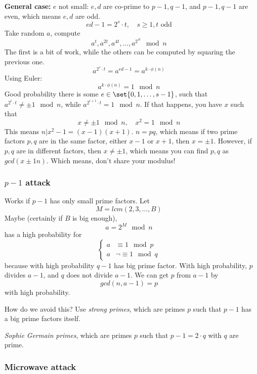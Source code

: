 \documentclass[language=english,number=]{homework}
\begin{document}
    \textbf{General case:} $e$ not small:
    $e,d$ are co-prime to $p-1,q-1$, and $p-1,q-1$ are even, which means $e,d$ are odd.
    \[
        ed-1 = 2^s \cdot t, \quad s \ge 1, t \text{ odd}
    \]
    Take random $a$, compute
    \[
        a^t, a^{2t}, a^{4t}, \dots, a^{2^{st}} \mod n
    \]
    The first is a bit of work, while the others can be computed by squaring the previous one.
    \[
        a^{2^s \cdot t} = a^{ed-1}= a^{k \cdot \phi(n)}
    \]
    Using Euler:
    \[
        a^{k \cdot \phi(n)} = 1 \mod n
    \]
    Good probability there is some $e \in \set{0,1, \dots, s-1}$, such that $a^{2^i \cdot t} \ne \pm 1 \mod n$, while $a^{2^{i+1} \cdot t} = 1 \mod n$.
    If that happens, you have $x$ such that
    \[
        x \ne \pm 1 \mod n, \quad x^2  = 1 \mod n
    \]
    This means $n| x^2 - 1 = (x-1)(x+1)$.
    $n = pq$, which means if two prime factors $p,q$ are in the same factor, either $x-1$ or $x+1$, then $x = \pm 1$.
    However, if $p,q$ are in different factors, then $x \ne \pm 1$, which means you can find $p,q$ as $gcd(x \pm 1 n)$.
    Which means, don't share your modulus!

    \subsubsection{$p-1$ attack}

    Works if $p-1$ has only small prime factors.
    Let
    \[
        M = lcm(2,3,\dots,B)
    \]
    Maybe (certainly if $B$ is big enough),
    \[
        a = 2^M \mod n
    \]
    has a high probability for
    \[
        \begin{cases}
            a &\equiv 1 \mod p \\
            a &\neg \equiv 1 \mod q
        \end{cases}
    \]
    because with high probability $q-1$ has big prime factor.
    With high probability, $p$ divides $a-1$, and $q$ does not divide $a-1$.
    We can get $p$ from $a-1$ by
    \[
        gcd(n,a-1) = p
    \]
    with high probability.

    How do we avoid this?
    Use \textit{strong primes}, which are primes $p$ such that $p-1$ has a big prime factors itself.

    \textit{Sophie Germain primes}, which are primes $p$ such that $p-1 = 2 \cdot q$ with $q$ are prime.

    \subsubsection{Microwave attack}
\end{document}
